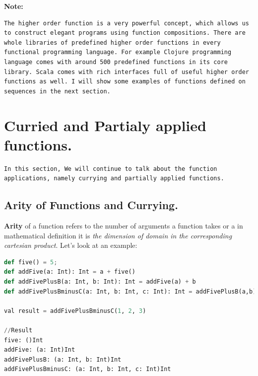 \documentclass[12pt,twoside,a4paper]{report}
\begin{document}
\textbf{Note:}
\begin{lstlisting}
The higher order function is a very powerful concept, which allows us to construct elegant programs using function compositions. There are whole libraries of predefined higher order functions in every functional programming language. For example Clojure programming language comes with around 500 predefined functions in its core library. Scala comes with rich interfaces full of useful higher order functions as well. I will show some examples of functions defined on sequences in the next section.
\end{lstlisting}

\section{Curried and Partialy applied functions.}\label{6.6}

\begin{lstlisting}
In this section, We will continue to talk about the function applications, namely currying and partially applied functions.
\end{lstlisting}

\subsection{Arity of Functions and Currying.}\label{6.6.1}

\textbf{Arity} of a function refers to the number of arguments a function takes or a in mathematical definition it is \emph{the dimension of domain in the corresponding cartesian product}. Let's look at an example:
\begin{lstlisting}[language=python]
def five() = 5;
def addFive(a: Int): Int = a + five()
def addFivePlusB(a: Int, b: Int): Int = addFive(a) + b
def addFivePlusBminusC(a: Int, b: Int, c: Int): Int = addFivePlusB(a,b) - c

val result = addFivePlusBminusC(1, 2, 3)

//Result
five: ()Int
addFive: (a: Int)Int
addFivePlusB: (a: Int, b: Int)Int
addFivePlusBminusC: (a: Int, b: Int, c: Int)Int
\end{lstlisting}
\end{document}
